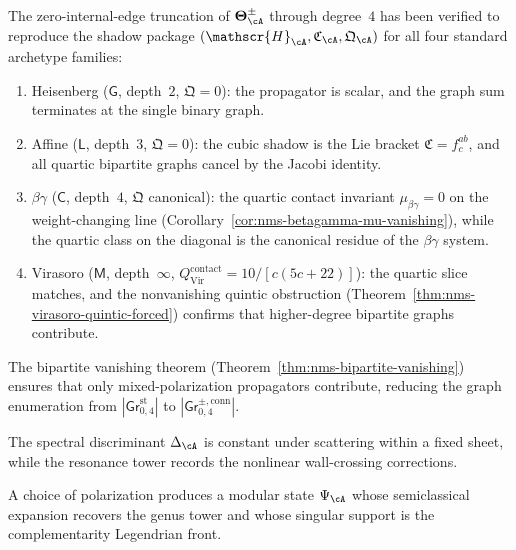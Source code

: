 \begin{remark}
\label{rem:quartic-lift-evidence}%
%
%
The zero-internal-edge truncation of $\boldsymbol\Theta_{\cA}^{\pm}$
through degree~$4$ has been verified to reproduce the shadow package
$(\mathscr{H}_{\cA}, \mathfrak{C}_{\cA}, \mathfrak{Q}_{\cA})$ for
all four standard archetype families:
\begin{enumerate}[label=\textup{(\roman*)}]
\item Heisenberg ($\mathsf{G}$, depth~$2$, $\mathfrak{Q} = 0$):
 the propagator is scalar, and the graph sum terminates at
 the single binary graph.
\item Affine ($\mathsf{L}$, depth~$3$, $\mathfrak{Q} = 0$):
 the cubic shadow is the Lie bracket
 $\mathfrak{C} = f^{ab}_c$, and all quartic bipartite
 graphs cancel by the Jacobi identity.
\item $\beta\gamma$ ($\mathsf{C}$, depth~$4$,
 $\mathfrak{Q}$ canonical):
 the quartic contact invariant $\mu_{\beta\gamma} = 0$
 on the weight-changing line
 (Corollary~\ref{cor:nms-betagamma-mu-vanishing}),
 while the quartic class on the diagonal is
 the canonical residue of the $\beta\gamma$ system.
\item Virasoro ($\mathsf{M}$, depth~$\infty$,
 $Q^{\mathrm{contact}}_{\mathrm{Vir}} = 10/[c(5c+22)]$):
 the quartic slice matches, and the nonvanishing quintic
 obstruction (Theorem~\ref{thm:nms-virasoro-quintic-forced})
 confirms that higher-degree bipartite graphs contribute.
\end{enumerate}
The bipartite vanishing theorem
(Theorem~\ref{thm:nms-bipartite-vanishing}) ensures that only
mixed-polarization propagators contribute, reducing the graph
enumeration from $|\mathsf{Gr}^{\mathrm{st}}_{0,4}|$ to
$|\mathsf{Gr}^{\pm,\mathrm{conn}}_{0,4}|$.
\end{remark}

\begin{conjecture}
\label{conj:nms-resonance-wall-crossing}
The spectral discriminant $\Delta_{\cA}$ is constant under scattering within a fixed sheet, while the resonance tower records the nonlinear wall-crossing corrections.
\end{conjecture}

\begin{conjecture}
\label{conj:nms-quantization-theorem}
A choice of polarization produces a modular state $\Psi_{\cA}$ whose
semiclassical expansion recovers the genus tower and whose singular
support is the complementarity Legendrian front.
\end{conjecture}

